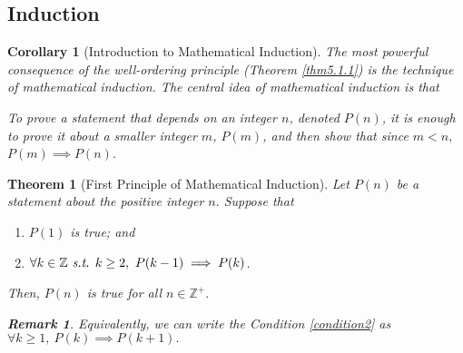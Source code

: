 \documentclass[12pt,a4paper]{article}
\newtheorem{thm}{Theorem}[subsection]
\newtheorem{cor}{Corollary}[section]
\newtheorem*{rmk}{\indent Remark}
\def\Z{{\mathbb{Z}}}
\def\Zp{{\Z^{+}}}
\def\st{\emph{ s.t. }}
\begin{document}
\subsection{Induction}
\begin{cor}[Introduction to Mathematical Induction]
	The most powerful consequence of the well-ordering	principle (Theorem \ref{thm5.1.1}) is the technique of mathematical induction. The central idea of mathematical induction is that \begin{center}\textit{To prove a statement that depends on an integer $n$, denoted $P(n)$, it is enough to prove it about a smaller integer $m$, $P(m)$, and then show that since $m<n,$ $P(m)\implies P(n)$.}\end{center}
\end{cor}
\begin{thm}[First Principle of Mathematical Induction]\label{induction}
	Let $P(n)$ be a statement about the positive integer $n.$ Suppose that 
	\begin{enumerate}
		\item $P(1)$ is true; and 
		\item\label{condition2} $\forall k\in\Z\st k\geq2,\ P(k-1)\implies P(k)$.
	\end{enumerate}	Then, $P(n)$ is true for all $n\in\Zp.$
	\begin{rmk} Equivalently, we can write the Condition \ref{condition2} as $\forall k\geq1,\ P(k)\implies P(k+1).$ \end{rmk}
\end{thm}
\end{document}

